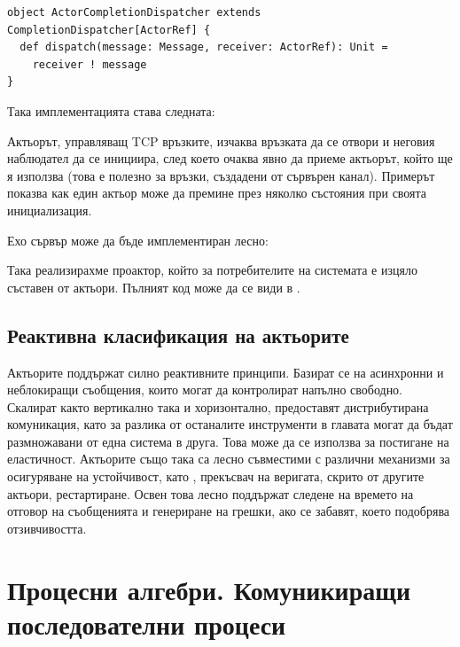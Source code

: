 \begin{lstlisting}
object ActorCompletionDispatcher extends CompletionDispatcher[ActorRef] {
  def dispatch(message: Message, receiver: ActorRef): Unit =
    receiver ! message
}
\end{lstlisting}

Така имплементацията става следната:



Актьорът, управляващ TCP връзките, изчаква връзката да се отвори и неговия наблюдател да се инициира, след което очаква явно да приеме актьорът, който ще я използва (това е полезно за връзки, създадени от сървърен канал). Примерът показва как един актьор може да премине през няколко състояния при своята инициализация.

Ехо сървър може да бъде имплементиран лесно:



Така реализирахме проактор, който за потребителите на системата е изцяло съставен от актьори. Пълният код може да се види в .

\subsection{Реактивна класификация на актьорите}

Актьорите поддържат силно реактивните принципи. Базират се на асинхронни и неблокиращи съобщения, които могат да контролират напълно свободно. Скалират както вертикално така и хоризонтално, предоставят дистрибутирана комуникация, като за разлика от останалите инструменти в главата могат да бъдат размножавани от една система в друга. Това може да се използва за постигане на еластичност. Актьорите също така са лесно съвместими с различни механизми за осигуряване на устойчивост, като , прекъсвач на веригата, скрито от другите актьори, рестартиране. Освен това лесно поддържат следене на времето на отговор на съобщенията и генериране на грешки, ако се забавят, което подобрява отзивчивостта.

\section{Процесни алгебри. Комуникиращи последователни процеси}


